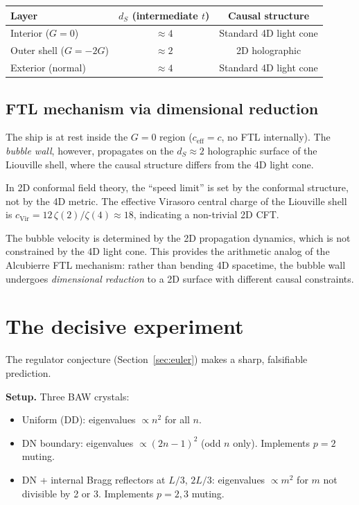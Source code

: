 \documentclass[aps,prd,twocolumn,superscriptaddress,nofootinbib]{revtex4-2}
\begin{document}
\begin{center}
\begin{tabular}{lcc}
\toprule
Layer & $d_S$ (intermediate $t$) & Causal structure \\
\midrule
Interior ($G = 0$) & $\approx 4$ & Standard 4D light cone \\
Outer shell ($G = -2G$) & $\approx 2$ & 2D holographic \\
Exterior (normal) & $\approx 4$ & Standard 4D light cone \\
\bottomrule
\end{tabular}
\end{center}

\subsection{FTL mechanism via dimensional reduction}

The ship is at rest inside the $G = 0$ region ($c_{\mathrm{eff}} = c$,
no FTL internally).
The \emph{bubble wall}, however, propagates on the $d_S \approx 2$
holographic surface of the Liouville shell, where the causal
structure differs from the 4D light cone.

In 2D conformal field theory, the ``speed limit'' is set by the
conformal structure, not by the 4D metric.
The effective Virasoro central charge of the Liouville shell is
$c_{\mathrm{Vir}} = 12\,\zeta(2)/\zeta(4) \approx 18$,
indicating a non-trivial 2D CFT.

The bubble velocity is determined by the 2D propagation dynamics,
which is not constrained by the 4D light cone.
This provides the arithmetic analog of the Alcubierre FTL mechanism:
rather than bending 4D spacetime, the bubble wall undergoes
\emph{dimensional reduction} to a 2D surface with different
causal constraints.

\section{The decisive experiment}
\label{sec:experiment}

The regulator conjecture (Section~\ref{sec:euler}) makes a sharp,
falsifiable prediction.

\textbf{Setup.} Three BAW crystals:
\begin{itemize}
\item[A.] Uniform (DD): eigenvalues $\propto n^2$ for all $n$.
\item[B.] DN boundary: eigenvalues $\propto (2n-1)^2$ (odd $n$ only).
  Implements $p = 2$ muting.
\item[C.] DN + internal Bragg reflectors at $L/3$, $2L/3$:
  eigenvalues $\propto m^2$ for $m$ not divisible by 2 or 3.
  Implements $p = 2, 3$ muting.
\end{itemize}
\end{document}
